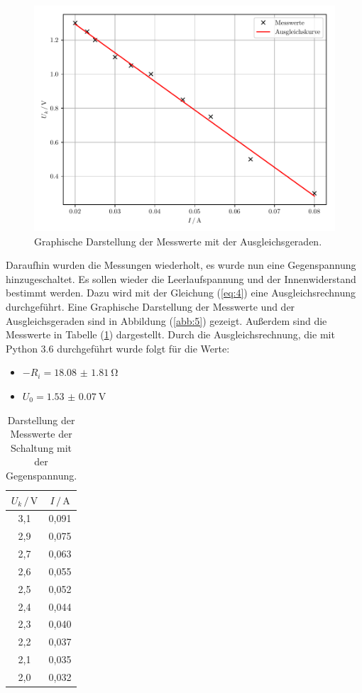 \begin{figure}[H]
  \centering
  \includegraphics{plot1.pdf}
  \caption{Graphische Darstellung der Messwerte mit der Ausgleichsgeraden.}
  \label{abb:4}
\end{figure}

Daraufhin wurden die Messungen wiederholt, es wurde nun eine Gegenspannung
hinzugeschaltet. Es sollen wieder die Leerlaufspannung und der Innenwiderstand bestimmt
werden. Dazu wird mit der Gleichung (\ref{eq:4}) eine Ausgleichsrechnung durchgeführt.
Eine Graphische Darstellung der Messwerte und der Ausgleichsgeraden sind in Abbildung (\ref{abb:5})
gezeigt. Außerdem sind die Messwerte in Tabelle (\ref{tab:2}) dargestellt.
Durch die Ausgleichsrechnung, die mit Python 3.6 durchgeführt wurde folgt für die Werte:

\begin{itemize}
  \item $-R_i = \SI{18.08(181)}{\ohm}$
  \item $U_0 = \SI{1.53(7)}{\volt}$
\end{itemize}

\begin{table}[H]
  \centering
  \caption{Darstellung der Messwerte der Schaltung mit der Gegenspannung.}
  \label{tab:2}
  \begin{tabular}{c c}
    \toprule
    $U_k \, / \, \si{\volt}$ & $ I \, / \, \si{\ampere}$ \\
    \midrule
    3,1 & 0,091 \\
    2,9 & 0,075 \\
    2,7 & 0,063 \\
    2,6 & 0,055 \\
    2,5 & 0,052 \\
    2,4 & 0,044 \\
    2,3 & 0,040 \\
    2,2 & 0,037 \\
    2,1 & 0,035 \\
    2,0 & 0,032 \\
    \bottomrule
  \end{tabular}
\end{table}

